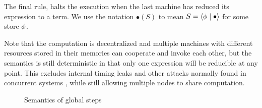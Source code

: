 The final rule,  halts the execution when the last machine has reduced its expression to a term. We use the notation $\bullet(S)$ to mean $S = \langle \phi \mid \bullet \rangle$ for some store $\phi$.

Note that the computation is decentralized and multiple machines with different resources stored in their memories can cooperate and invoke each other, but the semantics is still deterministic in that only one expression will be reducible at any point. This excludes internal timing leaks and other attacks normally found in concurrent systems \cite{Smith:1998:SIF:268946.268975, Muller:2012:TPS:2384616.2384621}, while still allowing multiple nodes to share computation.

\begin{figure*}
\centering
{}
\caption{Semantics of global steps}
\label{fig:global-steps}
\end{figure*}

